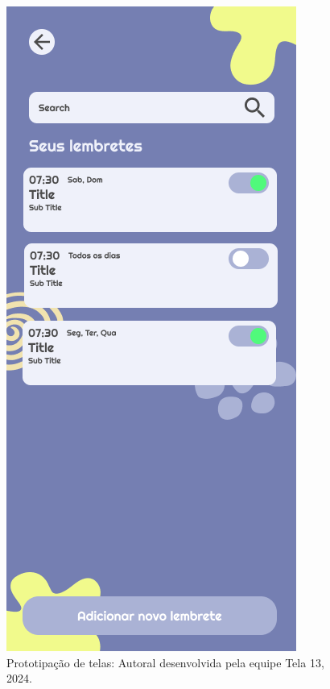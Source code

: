 \documentclass[12pt, openany, oneside, a4paper, english, brazil]{abntex2}   %
\begin{document}
\begin{figure}
    \centering
    \includegraphics[scale=0.7]{figuras/Math.Pow App/Reminders (1).png}
    \caption{Prototipação de telas: Autoral desenvolvida pela equipe Tela 13, 2024.}
    \label{fig:nome-da-imagem}
\end{figure}
\end{document}
